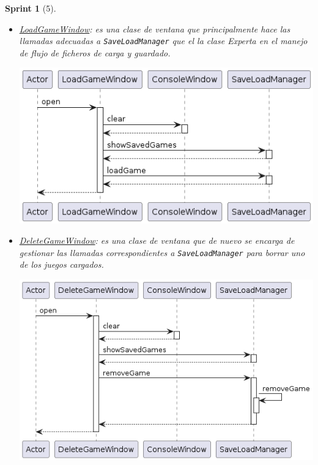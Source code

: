 \documentclass[12pt,a4paper,openright]{book}
\theoremstyle{break}
\newtheorem*{sprint}{Sprint}
\begin{document}
\begin{sprint}[5]
\begin{itemize}
\begin{center}
\end{center}

\item \underline{LoadGameWindow}: es una clase de ventana que principalmente hace las llamadas adecuadas a \texttt{SaveLoadManager} que el la clase \textit{Experta} en el manejo de flujo de ficheros de carga y guardado.
\begin{center}
\includegraphics[scale=0.5]{LoadGameWindow_sprint5_seq}
\end{center}

\item \underline{DeleteGameWindow}: es una clase de ventana que de nuevo se encarga de gestionar las llamadas correspondientes a \texttt{SaveLoadManager} para borrar uno de los juegos cargados.
\begin{center}
\includegraphics[scale=0.5]{DeleteGameWindow_sprint5_seq}
\end{center}
\end{itemize}


\end{sprint}
\end{document}
